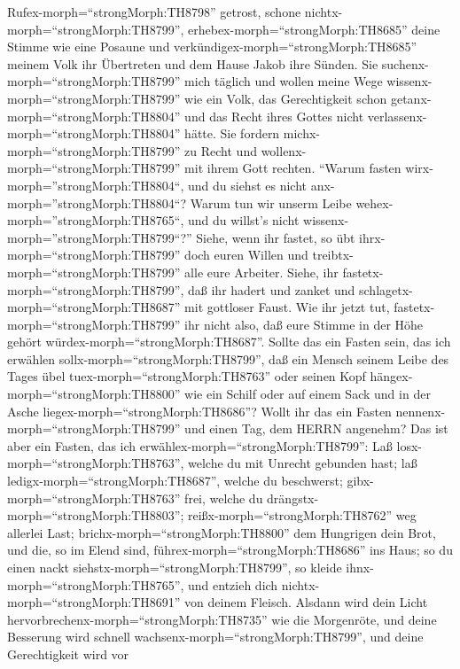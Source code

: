  Rufex-morph=``strongMorph:TH8798'' getrost, schone
nichtx-morph=``strongMorph:TH8799'',
erhebex-morph=``strongMorph:TH8685'' deine Stimme wie eine Posaune und
verkündigex-morph=``strongMorph:TH8685'' meinem Volk ihr Übertreten und
dem Hause Jakob ihre Sünden.  Sie
suchenx-morph=``strongMorph:TH8799'' mich täglich und wollen meine Wege
wissenx-morph=``strongMorph:TH8799'' wie ein Volk, das Gerechtigkeit
schon getanx-morph=``strongMorph:TH8804'' und das Recht ihres Gottes
nicht verlassenx-morph=``strongMorph:TH8804'' hätte. Sie fordern
michx-morph=``strongMorph:TH8799'' zu Recht und
wollenx-morph=``strongMorph:TH8799'' mit ihrem Gott rechten.
 ``Warum fasten wirx-morph=''strongMorph:TH8804``, und du
siehst es nicht anx-morph=''strongMorph:TH8804``? Warum tun wir unserm
Leibe wehex-morph=''strongMorph:TH8765``, und du willst's nicht
wissenx-morph=''strongMorph:TH8799``?'' Siehe, wenn ihr fastet, so übt
ihrx-morph=``strongMorph:TH8799'' doch euren Willen und
treibtx-morph=``strongMorph:TH8799'' alle eure Arbeiter. 
Siehe, ihr fastetx-morph=``strongMorph:TH8799'', daß ihr hadert und
zanket und schlagetx-morph=``strongMorph:TH8687'' mit gottloser Faust.
Wie ihr jetzt tut, fastetx-morph=``strongMorph:TH8799'' ihr nicht also,
daß eure Stimme in der Höhe gehört würdex-morph=``strongMorph:TH8687''.
 Sollte das ein Fasten sein, das ich erwählen
sollx-morph=``strongMorph:TH8799'', daß ein Mensch seinem Leibe des
Tages übel tuex-morph=``strongMorph:TH8763'' oder seinen Kopf
hängex-morph=``strongMorph:TH8800'' wie ein Schilf oder auf einem Sack
und in der Asche liegex-morph=``strongMorph:TH8686''? Wollt ihr das ein
Fasten nennenx-morph=``strongMorph:TH8799'' und einen Tag, dem HERRN
angenehm?  Das ist aber ein Fasten, das ich
erwählex-morph=``strongMorph:TH8799'': Laß
losx-morph=``strongMorph:TH8763'', welche du mit Unrecht gebunden hast;
laß ledigx-morph=``strongMorph:TH8687'', welche du beschwerst;
gibx-morph=``strongMorph:TH8763'' frei, welche du
drängstx-morph=``strongMorph:TH8803'';
reißx-morph=``strongMorph:TH8762'' weg allerlei Last; 
brichx-morph=``strongMorph:TH8800'' dem Hungrigen dein Brot, und die, so
im Elend sind, führex-morph=``strongMorph:TH8686'' ins Haus; so du einen
nackt siehstx-morph=``strongMorph:TH8799'', so kleide
ihnx-morph=``strongMorph:TH8765'', und entzieh dich
nichtx-morph=``strongMorph:TH8691'' von deinem Fleisch. 
Alsdann wird dein Licht hervorbrechenx-morph=``strongMorph:TH8735'' wie
die Morgenröte, und deine Besserung wird schnell
wachsenx-morph=``strongMorph:TH8799'', und deine Gerechtigkeit wird vor
